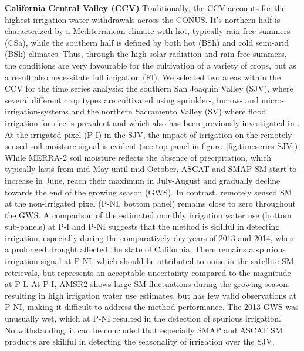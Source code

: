 \documentclass[hess, manuscript]{copernicus}
\begin{document}
\textbf{California Central Valley (CCV)}
Traditionally, the CCV accounts for the highest irrigation water withdrawals across the CONUS. It's northern half is characterized by a Mediterranean climate with hot, typically rain free summers (CSa), while the southern half is defined by both hot (BSh) and cold semi-arid (BSk) climates. Thus, through the high solar radiation and rain-free summers, the conditions are very favourable for the cultivation of a variety of crops, but as a result also necessitate full irrigation (FI). We selected two areas within the CCV for the time series analysis: the southern San Joaquin Valley (SJV), where several different crop types are cultivated using sprinkler-, furrow- and micro-irrigation-systems and the northern Sacramento Valley (SV) where flood irrigation for rice is prevalent and which also has been previously investigated in \citet{Lawston2017}.\\ 

At the irrigated pixel (\glqq P-I\grqq) in the SJV, the impact of irrigation on the remotely sensed soil moisture signal is evident (see top panel in figure~\ref{fig:timeseries-SJV}). While MERRA-2 soil moisture reflects the absence of precipitation, which typically lasts from mid-May until mid-October, ASCAT and SMAP SM start to increase in June, reach their maximum in July-August and gradually decline towards the end of the growing season (GWS). In contrast, remotely sensed SM at the non-irrigated pixel (\glqq P-NI\grqq, bottom panel) remains close to zero throughout the GWS. A comparison of the estimated monthly irrigation water use (bottom sub-panels) at P-I and P-NI suggests that the method is skillful in detecting irrigation, especially during the comparatively dry years of 2013 and 2014, when a prolonged drought affected the state of California. There remains a spurious irrigation signal at P-NI, which should be attributed to noise in the satellite SM retrievals, but represents an acceptable uncertainty compared to the magnitude at P-I. At P-I, AMSR2 shows large SM fluctuations during the growing season, resulting in high irrigation water use estimates, but has few valid observations at P-NI, making it difficult to address the method performance. The 2013 GWS was unusually wet, which at P-NI resulted in the detection of spurious irrigation. Notwithstanding, it can be concluded that especially SMAP and ASCAT SM products are skillful in detecting the seasonality of irrigation over the SJV.\\
\end{document}

